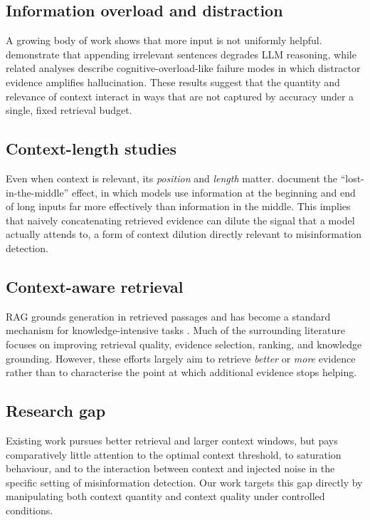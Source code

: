 \documentclass[11pt]{article}
\begin{document}
\subsection{Information overload and distraction}
A growing body of work shows that more input is not uniformly helpful. \citet{shi2023distracted} demonstrate that appending irrelevant sentences degrades LLM reasoning, while related analyses describe cognitive-overload-like failure modes in which distractor evidence amplifies hallucination. These results suggest that the quantity and relevance of context interact in ways that are not captured by accuracy under a single, fixed retrieval budget.

\subsection{Context-length studies}
Even when context is relevant, its \emph{position} and \emph{length} matter. \citet{liu2024lost} document the ``lost-in-the-middle'' effect, in which models use information at the beginning and end of long inputs far more effectively than information in the middle. This implies that naively concatenating retrieved evidence can dilute the signal that a model actually attends to, a form of context dilution directly relevant to misinformation detection.

\subsection{Context-aware retrieval}
RAG grounds generation in retrieved passages and has become a standard mechanism for knowledge-intensive tasks \citep{lewis2020rag,gao2024ragsurvey}. Much of the surrounding literature focuses on improving retrieval quality, evidence selection, ranking, and knowledge grounding. However, these efforts largely aim to retrieve \emph{better} or \emph{more} evidence rather than to characterise the point at which additional evidence stops helping.

\subsection{Research gap}
Existing work pursues better retrieval and larger context windows, but pays comparatively little attention to the optimal context threshold, to saturation behaviour, and to the interaction between context and injected noise in the specific setting of misinformation detection. Our work targets this gap directly by manipulating both context quantity and context quality under controlled conditions.
\end{document}
